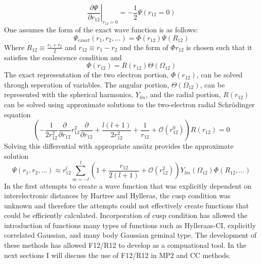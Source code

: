       \begin{equation}
          \left. \frac{\partial \Psi}{\partial r_{12}} \right |_{r_{12}=0} = - \frac{1}{2} \Psi(r_{12}=0)
        \end{equation}
    One assumes the form of the exact wave function is as follows:
      \begin{equation}
        \Psi_{exact}(r_1, r_2 , \dots) = \Phi(r_{12})\Psi(R_{12})
      \end{equation}
    Where $R_{12} \equiv \frac{r_1 + r_2}{2}$ and $r_{12} \equiv r_1 - r_2$ and the form of $\Phi{r_{12}}$ is chosen such that it satisfies the coalescence condition and 
      \begin{equation}
        \Phi(r_{12}) = R(r_{12})\Theta(\Omega_{12})
      \end{equation}
    The exact representation of the two electron portion, $\Phi(r_{12})$, can be solved through seperation of variables.  The angular portion, $\Theta(\Omega_{12})$, can be represented with the spherical harmonics, $Y_{lm}$, and the radial portion, $R(r_{12})$ can be solved using approximate solutions to the two-electron radial Schr{\"o}dinger equation
      \begin{equation}
        \left( -\frac{1}{2r^2_{12}} \frac{\partial}{\partial r_{12}} r^2_{12} \frac{\partial}{\partial r_{12}} + \frac{l(l+1)}{2r^2_{12}} + \frac{1}{r_{12}} + \mathcal{O}(r^0_{12}) \right) R(r_{12}) = 0
      \end{equation}
    Solving this differential with appropriate ans{\"a}tz provides the approximate solution
      \begin{equation}
        \Psi(r_1, r_2, \dots) \approx r^l_{12} \sum_{m=-l}^l\left( 1 + \frac{r_{12}}{2(l+1)} + \mathcal{O}(r^2_{12})\right) Y_{lm}(\Omega_{12})\Phi(R_{12},\dots)
      \end{equation}
    In the first attempts to create a wave function that was explicitly dependent on interelectronic distances by Hartree \cite{Hartree 1928} and Hylleras\cite{Hylleras 1929}, the cusp condition was unknown and therefore the attempts could not effectively create functions that could be efficiently calculated.  Incorporation of cusp condition has allowed the introduction of functions many types of functions such as Hylleraas-CI, explicitly correlated Gaussian, and many body Gaussian geminal type.\cite{Kong 2012}  The development of these methods has allowed F12/R12 to develop as a compuational tool.
    In the next sections I will discuss the use of F12/R12 in MP2 and CC methods.
